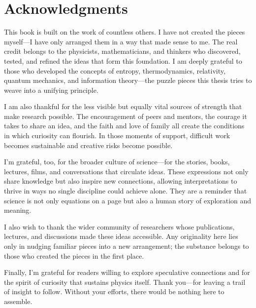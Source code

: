 \cleardoublepage
\section*{Acknowledgments}

This book is built on the work of countless others. I have not created the pieces myself—I have only arranged them in a way that made sense to me. The real credit belongs to the physicists, mathematicians, and thinkers who discovered, tested, and refined the ideas that form this foundation. I am deeply grateful to those who developed the concepts of entropy, thermodynamics, relativity, quantum mechanics, and information theory—the puzzle pieces this thesis tries to weave into a unifying principle.

I am also thankful for the less visible but equally vital sources of strength that make research possible. The encouragement of peers and mentors, the courage it takes to share an idea, and the faith and love of family all create the conditions in which curiosity can flourish. In those moments of support, difficult work becomes sustainable and creative risks become possible.

I’m grateful, too, for the broader culture of science—for the stories, books, lectures, films, and conversations that circulate ideas. These expressions not only share knowledge but also inspire new connections, allowing interpretations to thrive in ways no single discipline could achieve alone. They are a reminder that science is not only equations on a page but also a human story of exploration and meaning.

I also wish to thank the wider community of researchers whose publications, lectures, and discussions made these ideas accessible. Any originality here lies only in nudging familiar pieces into a new arrangement; the substance belongs to those who created the pieces in the first place.

Finally, I’m grateful for readers willing to explore speculative connections and for the spirit of curiosity that sustains physics itself. Thank you—for leaving a trail of insight to follow. Without your efforts, there would be nothing here to assemble.

